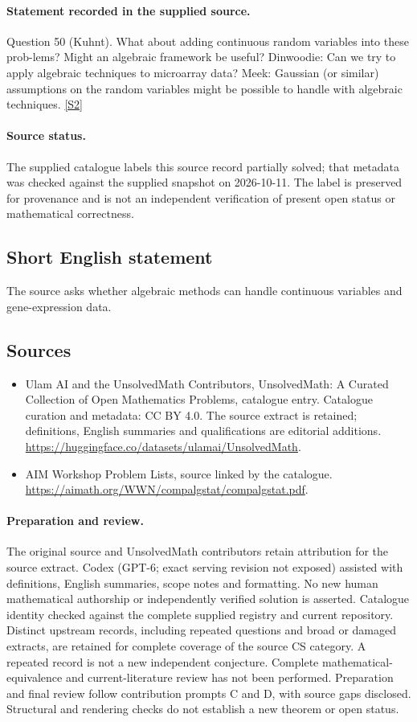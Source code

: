 \documentclass[11pt]{article}
\begin{document}
\paragraph{Statement recorded in the supplied source.}
Question 50 (Kuhnt). What about adding continuous random variables into these prob-lems? Might an algebraic framework be useful? Dinwoodie: Can we try to apply algebraic techniques to microarray data? Meek: Gaussian (or similar) assumptions on the random variables might be possible to handle with algebraic techniques. \href{https://aimath.org/WWN/compalgstat/compalgstat.pdf}{[S2]}
\paragraph{Source status.}
The supplied catalogue labels this source record partially solved; that metadata was checked against the supplied snapshot on 2026-10-11. The label is preserved for provenance and is not an independent verification of present open status or mathematical correctness.
\subsection{Short English statement}
The source asks whether algebraic methods can handle continuous variables and gene-expression data.
\subsection{Sources}
\begin{itemize}
\item[S1] Ulam AI and the UnsolvedMath Contributors, UnsolvedMath: A Curated Collection of Open Mathematics Problems, catalogue entry. Catalogue curation and metadata: CC BY 4.0. The source extract is retained; definitions, English summaries and qualifications are editorial additions.
\url{https://huggingface.co/datasets/ulamai/UnsolvedMath}.
\item[S2] AIM Workshop Problem Lists, source linked by the catalogue.
\url{https://aimath.org/WWN/compalgstat/compalgstat.pdf}.
\end{itemize}
\paragraph{Preparation and review.}
The original source and UnsolvedMath contributors retain attribution for the source extract. Codex (GPT-6; exact serving revision not exposed) assisted with definitions, English summaries, scope notes and formatting. No new human mathematical authorship or independently verified solution is asserted. Catalogue identity checked against the complete supplied registry and current repository. Distinct upstream records, including repeated questions and broad or damaged extracts, are retained for complete coverage of the source CS category. A repeated record is not a new independent conjecture. Complete mathematical-equivalence and current-literature review has not been performed. Preparation and final review follow contribution prompts C and D, with source gaps disclosed. Structural and rendering checks do not establish a new theorem or open status.
\label{end:statement}
\end{document}
